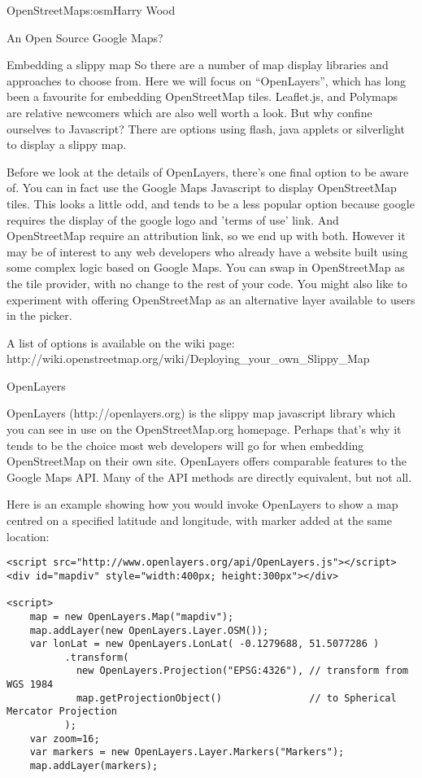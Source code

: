 \begin{aosachapter}{OpenStreetMap}{s:osm}{Harry Wood}
\begin{aosasect1}{An Open Source Google Maps?}
\begin{aosasect2}{Embedding a slippy map}
So there are a number of map display libraries and approaches to
choose from. Here we will focus on ``OpenLayers'', which has long been
a favourite for embedding OpenStreetMap tiles. Leaflet.js, and
Polymaps are relative newcomers which are also well worth a look. But
why confine ourselves to Javascript? There are options using flash,
java applets or silverlight to display a slippy map.

Before we look at the details of OpenLayers, there's one final option
to be aware of. You can in fact use the Google Maps Javascript to
display OpenStreetMap tiles. This looks a little odd, and tends to be
a less popular option because google requires the display of the
google logo and 'terms of use' link. And OpenStreetMap require an
attribution link, so we end up with both. However it may be of
interest to any web developers who already have a website built using
some complex logic based on Google Maps. You can swap in OpenStreetMap
as the tile provider, with no change to the rest of your code. You
might also like to experiment with offering OpenStreetMap as an
alternative layer available to users in the picker.

A list of options is available on the wiki page:
http://wiki.openstreetmap.org/wiki/Deploying\_your\_own\_Slippy\_Map

\end{aosasect2}

\begin{aosasect2}{OpenLayers}

OpenLayers (http://openlayers.org) is the slippy map javascript
library which you can see in use on the OpenStreetMap.org
homepage. Perhaps that's why it tends to be the choice most web
developers will go for when embedding OpenStreetMap on their own
site. OpenLayers offers comparable features to the Google Maps
API. Many of the API methods are directly equivalent, but not all.

Here is an example showing how you would invoke OpenLayers to show a
map centred on a specified latitude and longitude, with marker added
at the same location:

\begin{verbatim}
<script src="http://www.openlayers.org/api/OpenLayers.js"></script>
<div id="mapdiv" style="width:400px; height:300px"></div>

<script>
    map = new OpenLayers.Map("mapdiv");
    map.addLayer(new OpenLayers.Layer.OSM());
    var lonLat = new OpenLayers.LonLat( -0.1279688, 51.5077286 )
          .transform(
            new OpenLayers.Projection("EPSG:4326"), // transform from WGS 1984
            map.getProjectionObject()               // to Spherical Mercator Projection
          );
    var zoom=16;
    var markers = new OpenLayers.Layer.Markers("Markers");
    map.addLayer(markers);


\end{verbatim}
\end{aosasect2}
\end{aosasect1}
\end{aosachapter}
